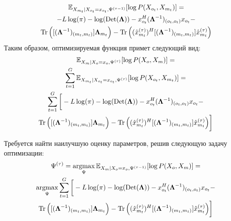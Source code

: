 \documentclass[11pt]{article}
\newcommand{\Expect}{\mathbb{E}}
\DeclareMathOperator*{\argmax}{argmax}
\DeclareMathOperator{\Det}{Det}
\begin{document}
\begin{equation*}
\begin{gathered}
\Expect_{X_{m_t}|X_{o_t}=x_{o_t}, \Psi^{(\tau-1)}}[\log P(X_{o_t}, X_{m_t})]=\\
-L \log(\pi) - \log (\Det(\mathbf{\Lambda})) - x_{o_t}^H (\mathbf{\Lambda}^{-1})_{(o_t, o_t)}x_{o_t} -  \\ \Tr \Big( [(\mathbf{\Lambda}^{-1})_{(m_t, m_t)}]\mathbf{\Lambda}_{m_t} \Big) - \Tr \Big((\hat{x}_{m_t}^{(\tau)})^H[(\mathbf{\Lambda}^{-1})_{(m_t, m_t)}]\hat{x}_{m_t}^{(\tau)} \Big) 
\end{gathered}
\end{equation*}
Таким образом, оптимизируемая функция примет следующий вид:
\begin{equation*}
\begin{gathered}
 \Expect_{X_m|X_o=x_o, \Psi^{(\tau)}}[\log P(X_o, X_m)] = \\
 \sum_{t=1}^G\Expect_{X_{m_t}|X_{o_t}=x_{o_t}, \Psi^{(\tau)}}[\log P(X_{o_t}, X_{m_t})] = \\
\sum_{t=1}^G \bigg[ -L \log(\pi) - \log (\Det(\mathbf{\Lambda})) - x_{o_t}^H (\mathbf{\Lambda}^{-1})_{(o_t, o_t)}x_{o_t} -  \\ \Tr \Big( [(\mathbf{\Lambda}^{-1})_{(m_t, m_t)}]\mathbf{\Lambda}_{m_t} \Big) - \Tr \Big((\hat{x}_{m_t}^{(\tau)})^H[(\mathbf{\Lambda}^{-1})_{(m_t, m_t)}]\hat{x}_{m_t}^{(\tau)} \Big)  \bigg]
\end{gathered}
\end{equation*}
\begin{center}
\fontsize{14}{18}\selectfont {}
\end{center}
Требуется найти наилучшую оценку параметров, решив следующую задачу оптимизации:
\begin{equation*}
\begin{gathered}
\Psi^{(\tau)}=\argmax_{\Psi} \Expect_{X_m|X_o=x_o, \Psi^{(\tau-1)}}[\log P(X_o, X_m)] =\\
\argmax_{\Psi}  \sum_{t=1}^G \bigg[ -L \log(\pi) - \log (\Det(\mathbf{\Lambda})) - x_{o_t}^H (\mathbf{\Lambda}^{-1})_{(o_t, o_t)}x_{o_t} -  \\ \Tr \Big( [(\mathbf{\Lambda}^{-1})_{(m_t, m_t)}]\mathbf{\Lambda}_{m_t} \Big) - \Tr \Big((\hat{x}_{m_t}^{(\tau)})^H[(\mathbf{\Lambda}^{-1})_{(m_t, m_t)}]\hat{x}_{m_t}^{(\tau)} \Big)  \bigg]
\end{gathered}
\end{equation*}
\begin{center}
\fontsize{14}{18}\selectfont {}
\end{center}
\end{document}
